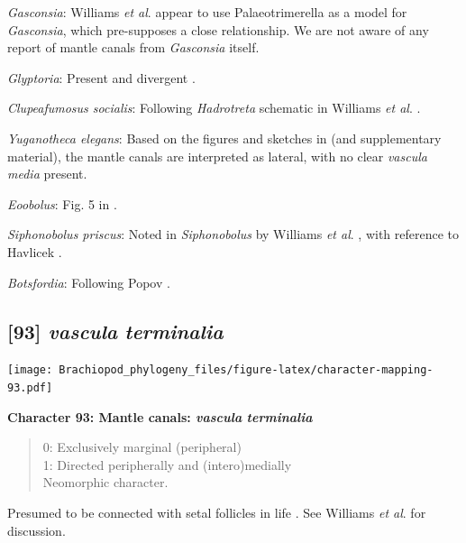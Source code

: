 \documentclass[]{book}
\theoremstyle{definition}
\theoremstyle{definition}
\theoremstyle{definition}
\theoremstyle{remark}
\begin{document}
\emph{Gasconsia}: Williams \emph{et al}. \citeyearpar[table
15]{Williams2000BrachiopodaLinguliformea} appear to use Palaeotrimerella
\citep[as drawn in][]{Williams1997BrachiopodaRevised} as a model for
\emph{Gasconsia}, which pre-supposes a close relationship. We are not
aware of any report of mantle canals from \emph{Gasconsia} itself.

\emph{Glyptoria}: Present and divergent
\citep{Williams2000BrachiopodaLinguliformea}.

\emph{Clupeafumosus socialis}: Following \emph{Hadrotreta} schematic in
Williams \emph{et al}.
\citeyearpar{Williams2000BrachiopodaLinguliformea}.

\emph{Yuganotheca elegans}: Based on the figures and sketches in
\citet{Zhang2014Anearly} (and supplementary material), the mantle canals
are interpreted as lateral, with no clear \emph{vascula} \emph{media}
present.

\emph{Eoobolus}: Fig. 5 in \citet{Balthasar2009Thebrachiopod}.

\emph{Siphonobolus priscus}: Noted in \emph{Siphonobolus} by Williams
\emph{et al}. \citeyearpar{Williams2000BrachiopodaLinguliformea}, with
reference to Havlicek \citeyearpar{Havlicek1982LingulaceaPaterinacea}.

\emph{Botsfordia}: Following Popov \citeyearpar[fig.
2]{Popov1992TheCambrian}.

\hypertarget{vascula-terminalia}{%
\subsection*{\texorpdfstring{{[}93{]} \emph{vascula}
\emph{terminalia}}{{[}93{]} vascula terminalia}}\label{vascula-terminalia}}

\texttt{[image: Brachiopod\_phylogeny\_files/figure-latex/character-mapping-93.pdf]}

\textbf{Character 93: Mantle canals: \emph{vascula} \emph{terminalia}}

\begin{quote}
0: Exclusively marginal (peripheral)\\
1: Directed peripherally and (intero)medially\\
Neomorphic character.
\end{quote}

Presumed to be connected with setal follicles in life
\citep{Williams1998Thediversity}. See Williams \emph{et al}.
\citeyearpar{Williams2000BrachiopodaLinguliformea} for discussion.
\end{document}
